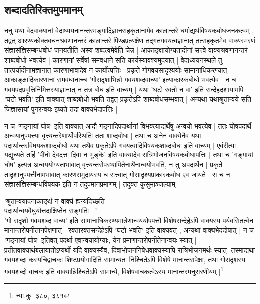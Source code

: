 \subsection{शब्दादतिरिक्तमुपमानम्}

ननु यथा वेदवाक्यानां वेदाध्ययनानन्तरमङ्गादिज्ञानसहकृतानामेव कालान्तरे धर्माद्यर्थविषयकबोधजनकत्वम् , तद्वत् आरण्यकोक्तवचनश्रवणानन्तरं कालान्तरे पिण्डप्रत्यक्षेण तद्गतगवयत्वज्ञानात् तत्सहकृतमेव वाक्यस्मरणं संज्ञासंज्ञिसम्बन्धबोधं जनयतीति अस्य शब्दत्वमेवेति चेन्न | आकाङ्क्षायोग्यतादीनां सत्त्वे वाक्यश्रवणानन्तरं शाब्दबोधो भवत्येव | कारणानां सर्वेषां समवधाने सति कार्यस्यावश्यमुदयात् | वेदाध्ययनस्थले तु तात्पर्यादीनामज्ञानात् कारणाभावादेव न कार्योत्पत्तिः | प्रकृते गोगवयसादृश्ययोः सामानाधिकरण्यात् आकाङ्क्षादिकारणानां समवधानाच्च 'गोसदृशाभिन्नो गवयशब्दवाच्यः' इत्याकारकबोधो भवत्येव | न च गवयपदप्रवृत्तिनिमित्तस्याज्ञानात् न तत्र बोध इति वाच्यम् | यथा 'घटो रक्तो न वा' इति सन्देहदशायामपि 'घटो भवति' इति वाक्यात् शाब्दबोधो भवति तद्वत् प्रकृतेऽपि शाब्दबोधसम्भवात् | अन्यथा यथाश्रुतान्वये सति जिज्ञासायां पुनरन्वयः इष्यते तदा वाक्यभेदापत्तिः |

न च 'गङ्गायां घोष' इति वाक्यात् आदौ गङ्गादिपदार्थानां विभक्त्याद्यर्थेषु अन्वयो भवत्येव | ततः घोषपदार्थे अन्वयानुपपत्त्या वृत्त्यन्तरेणार्थोपस्थितिः ततः शाब्दबोधः | तथा च अनेन वाक्येनैव यथा पदार्थान्तरविषयकशाब्दबोधो यथा तथैव प्रकृतेऽपि गवयत्वादिविषयकशाब्दबोधः इति वाच्यम् | एवंरीत्या यद्युच्यते तर्हि 'पीनो देवदत्तः दिवा न भुङ्के' इति वाक्यादेव रात्रिभोजनविषयकबोधापत्तिः | तथा च 'गङ्गायां घोष' इत्यत्र अन्वययोग्यताभावात् वृत्त्यन्तरोपस्थापितेनार्थेनान्वयोभवति, न तु अपदार्थेन | प्रकृते तादृशानुपपत्तीनामभावात् कारणसमुदायस्य च सत्त्वात् गोसादृश्यप्राकारकबोध एव जायते | स च न संज्ञासंज्ञिसम्बन्धविषयक इति न तदुपमानप्रमाणम् | तदुक्तं कुसुमाञ्जल्याम् -

{\fontsize{11.7}{0}\selectfont\s 'श्रुतान्वयादनाकाङ्क्षं न वाक्यं ह्यन्यदिच्छति |\\ पदार्थान्वयवैधुर्यात्तदाक्षिप्तेन सङ्गतिः ||'\\ 'गो सदृशो गवयशब्द वाच्य' इति सामानाधिकरण्यमात्रेणान्वययोपपत्तौ विशेषसन्देहेऽपि वाक्यस्य पर्यवसितत्वेन मानान्तरोपनीतानपेक्षणात् | रक्तारक्तसन्देहेऽपि 'घटो भवति' इति वाक्यवत् , अन्यथा वाक्यभेददोषात् | न च 'गङ्गायां घोष' इतिवत् पदर्था एवान्वयायोग्याः, येन प्रमाणान्तरोपनीतेनान्वयः स्यात् | प्रतीतवाक्यार्थबलायातोऽप्यर्थो यदि वाक्यस्यैव, दिवाभोजननिषेधवाक्यस्यापि रात्रिभोजनमर्थः स्यात् |तस्माद्यथा गवयशब्दः कस्यचिद्वाचकः शिष्टप्रयोगादिति सामान्यतः निश्चितेऽपि विशेषे मानान्तरापेक्षा, तथा गोसदृशस्य गवयशब्दो वाचक इति वाक्यान्निश्चितेऽपि सामान्ये, विशेषवाचकत्वेऽस्य मानान्तरमनुसरणीयम् |\footnote{न्या.कु. ३८०, ३८१}}

